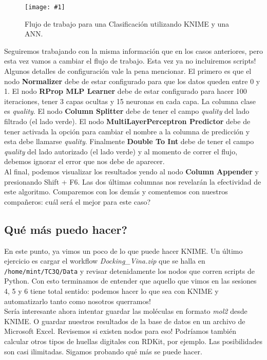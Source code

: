 \documentclass[10pt,letterpaper]{article}
\newcommand{\inlinecode}[1]{
\colorbox{light-gray}{\texttt{#1}}
}
\newcommand{\Picture}[3]
{
	\begin{figure}[H]
	\begin{center}
	\caption{#3}
	\texttt{[image: \#1]}
	\end{center}
	\end{figure}
}
\begin{document}
\Picture{img/ann_mlp.png}{0.45}{Flujo de trabajo para una Clasificaci\'on utilizando KNIME y una ANN.}
Seguiremos trabajando con la misma informaci\'on que en los casos anteriores, pero esta vez vamos a cambiar el flujo de trabajo. Esta vez ya no incluiremos scripts! Algunos detalles de configuraci\'on vale la pena mencionar. El primero es que el nodo \textbf{Normalizer} debe de estar configurado para que los datos queden entre 0 y 1. El nodo \textbf{RProp MLP Learner} debe de estar configurado para hacer 100 iteraciones, tener 3 capas ocultas y 15 neuronas en cada capa. La columna clase es \emph{quality}. El nodo \textbf{Column Splitter} debe de tener el campo \emph{quality} del lado filtrado (el lado verde). El nodo \textbf{MultiLayerPerceptron Predictor} debe de tener activada la opci\'on para cambiar el nombre a la columna de predicci\'on y esta debe llamarse \emph{quality}. Finalmente \textbf{Double To Int} debe de tener el campo \emph{quality} del lado autorizado (el lado verde) y al momento de correr el flujo, debemos ignorar el error que nos debe de aparecer.\\

Al final, podemos visualizar los resultados yendo al nodo \textbf{Column Appender} y presionando Shift + F6. Las dos \'ultimas columnas nos revelar\'an la efectividad de este algoritmo. Comparemos con los dem\'as y comentemos con nuestros compa\~neros: cu\'al ser\'a el mejor para este caso?

\subsection{Qu\'e m\'as puedo hacer?}
En este punto, ya vimos un poco de lo que puede hacer KNIME. Un \'ultimo ejercicio es cargar el workflow \textit{Docking\_Vina.zip} que se halla en \inlinecode{/home/mint/TC3Q/Data} y revisar detenidamente los nodos que corren scripts de Python. Con esto terminamos de entender que aquello que vimos en las sesiones 4, 5 y 6 tiene total sentido: podemos hacer lo que sea con KNIME y automatizarlo tanto como nosotros querramos!\\

Ser\'ia interesante ahora intentar guardar las mol\'eculas en formato \emph{mol2} desde KNIME. O guardar nuestros resultados de la base de datos en un archivo de Microsoft Excel. Revisemos si existen nodos para eso! Podr\'iamos tambi\'en calcular otros tipos de huellas digitales con RDKit, por ejemplo. Las posibilidades son casi ilimitadas. Sigamos probando qu\'e m\'as se puede hacer.
\end{document}
